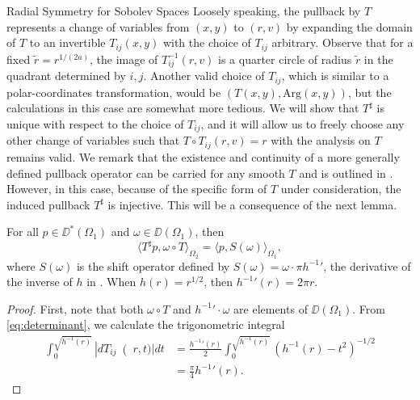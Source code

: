 \begin{chapter}{Radial Symmetry for Sobolev Spaces}
Loosely speaking, the pullback by $T$ represents a change of variables from $(x,y)$ to $(r,v)$ by expanding the domain of $T$ to an invertible $T_{ij}(x,y)$ with the choice of $T_{ij}$ arbitrary.  
Observe that for a fixed $\tilde r = r^{1/(2a)}$, the image of $T_{ij}^{-1}(r,v)$ is a quarter circle of radius $\tilde r$ in the quadrant determined by $i,j$.
Another valid choice of $T_{ij}$, which is similar to a polar-coordinates transformation, would be $(T(x,y), \mathrm{Arg}(x,y))$, but the calculations in this case are somewhat more tedious.
We will show that $T^\sharp$ is unique with respect to the choice of $T_{ij}$, and it will allow us to freely choose any other change of variables such that $T \circ T_{ij}(r,v) = r$ with the analysis on $T$ remains valid.
We remark that the existence and continuity of a more generally defined pullback operator can be carried for any smooth $T$ and is outlined in \citep{hormander1983}.
However, in this case, because of the specific form of $T$ under consideration, the induced pullback $T^\sharp$ is injective. 
This will be a consequence of the next lemma.
\begin{lem} \label{lem:innerProduct}
  For all $p\in\DD^*(\Omega_1)$ and $\omega \in \DD(\Omega_1)$, then 
  \begin{equation}
    \langle T^\sharp p , \omega \circ T \rangle_{\Omega_2} = \langle p,S(\omega)\rangle_{\Omega_1},
  \end{equation}
  where $S(\omega)$ is the shift operator defined by $S(\omega) = \omega\cdot\pi {h^{-1}}'$, the derivative of the inverse of $h$ in . 
  When $h(r) = r^{1/2}$, then ${h^{-1}}'(r) = 2\pi r$.
\end{lem}
\begin{proof}
  First, note that both $\omega \circ T$ and ${h^{-1}}'\cdot \omega$ are elements of $\DD(\Omega_1)$.  
  From \eqref{eq:determinant}, we calculate the trigonometric integral
  \begin{align}
    \int_0^{\sqrt{h^{-1}(r)}} \left|dT_{ij}\right(r,t)| dt 
    &= \frac{{h^{-1}}'(r)}2 \int_0^{\sqrt{h^{-1}(r)}}\left(h^{-1}(r) - t^2\right)^{-1/2}\nonumber\\
    &= \frac\pi4 {h^{-1}}'(r).

\end{align}
\end{proof}
\end{chapter}
